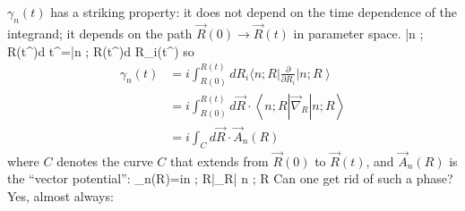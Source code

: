 \documentclass[12pt]{article}
\begin{document}
$\gamma_{n}(t)$ has a striking property: it does not depend
on the time dependence of the integrand; it depends 
on the path $\vec{R}(0) \to \vec{R}(t)$  in parameter space.
\be
{}\left|n ; R\left(t^{\prime}\right)\right\rangle d t^{\prime}=\left|n ; R\left(t^{\prime}\right)\right\rangle d R_{i}\left(t^{\prime}\right)
\ee
so
\begin{align}
\gamma_{n}(t)
&=i \int_{R(0)}^{R(t)} d R_{i}\langle n ; R| \frac{\partial}{\partial R_{i}}\left|n ; R\right\rangle\nonumber\\
&=i \int_{R(0)}^{R(t)} d \vec{R} \cdot\left\langle n ; R\left|\vec{\nabla}_{\!R}\right| n ; R\right\rangle\\
&=i \int_{C} d \vec{R} \cdot \vec{A}_{n}(R)
\end{align}
where $C$ denotes the curve $C$ that extends from
$\vec{R}(0)$ to $\vec{R}(t)$, and $\vec{A}_{n}(R)$ is the ``vector
potential'':
\be
{}_{n}(R)=i\langle n ; R|\vec{\nabla}_{\!R}| n ; R\rangle
\label{eq:g118}
\ee
Can one get rid of such a phase? Yes, almost always:
\end{document}
